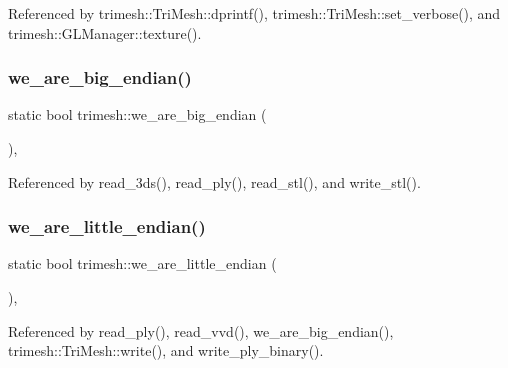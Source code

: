Referenced by trimesh\+::\+Tri\+Mesh\+::dprintf(), trimesh\+::\+Tri\+Mesh\+::set\+\_\+verbose(), and trimesh\+::\+G\+L\+Manager\+::texture().

\mbox{\label{namespacetrimesh_a5f014f93115b2ad19a671963155db453}} 
\subsubsection{\texorpdfstring{we\+\_\+are\+\_\+big\+\_\+endian()}{we\_are\_big\_endian()}}
{\footnotesize\ttfamily static bool trimesh\+::we\+\_\+are\+\_\+big\+\_\+endian (\begin{DoxyParamCaption}{ }\end{DoxyParamCaption})\hspace{0.3cm}{\ttfamily [inline]}, {\ttfamily [static]}}



Referenced by read\+\_\+3ds(), read\+\_\+ply(), read\+\_\+stl(), and write\+\_\+stl().

\mbox{\label{namespacetrimesh_a1b46ad9009f2ad07c2b89bf1543ab9d0}} 
\subsubsection{\texorpdfstring{we\+\_\+are\+\_\+little\+\_\+endian()}{we\_are\_little\_endian()}}
{\footnotesize\ttfamily static bool trimesh\+::we\+\_\+are\+\_\+little\+\_\+endian (\begin{DoxyParamCaption}{ }\end{DoxyParamCaption})\hspace{0.3cm}{\ttfamily [inline]}, {\ttfamily [static]}}



Referenced by read\+\_\+ply(), read\+\_\+vvd(), we\+\_\+are\+\_\+big\+\_\+endian(), trimesh\+::\+Tri\+Mesh\+::write(), and write\+\_\+ply\+\_\+binary().

\mbox{\label{namespacetrimesh_a25928ef7b7afbe31c7ed54639b496745}} 
